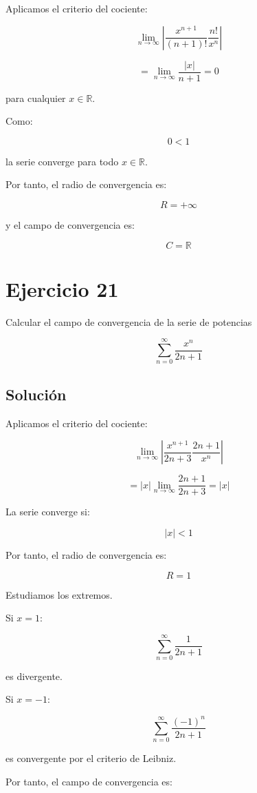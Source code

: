 \documentclass[fleqn]{article}
\begin{document}
	Aplicamos el criterio del cociente:

	\[
	\lim_{n\to\infty}
	\left|
	\frac{x^{n+1}}{(n+1)!}
	\frac{n!}{x^n}
	\right|
	\]

	\[
	=
	\lim_{n\to\infty}
	\frac{|x|}{n+1}
	=
	0
	\]

	para cualquier $x\in\mathbb{R}$.

	Como:

	\[
	0<1
	\]

	la serie converge para todo $x\in\mathbb{R}$.

	Por tanto, el radio de convergencia es:

	\[
	\boxed{
	R=+\infty
	}
	\]

	y el campo de convergencia es:

	\[
	\boxed{
	C=\mathbb{R}
	}
	\]

\section{Ejercicio 21}
	Calcular el campo de convergencia de la serie de potencias

	\[
	\sum_{n=0}^{\infty}\frac{x^n}{2n+1}
	\]

	\subsection{Solución}

	Aplicamos el criterio del cociente:

	\[
	\lim_{n\to\infty}
	\left|
	\frac{x^{n+1}}{2n+3}
	\frac{2n+1}{x^n}
	\right|
	\]

	\[
	=
	|x|
	\lim_{n\to\infty}
	\frac{2n+1}{2n+3}
	=
	|x|
	\]

	La serie converge si:

	\[
	|x|<1
	\]

	Por tanto, el radio de convergencia es:

	\[
	\boxed{
	R=1
	}
	\]

	Estudiamos los extremos.

	Si $x=1$:

	\[
	\sum_{n=0}^{\infty}\frac{1}{2n+1}
	\]

	es divergente.

	Si $x=-1$:

	\[
	\sum_{n=0}^{\infty}\frac{(-1)^n}{2n+1}
	\]

	es convergente por el criterio de Leibniz.

	Por tanto, el campo de convergencia es:
\end{document}
